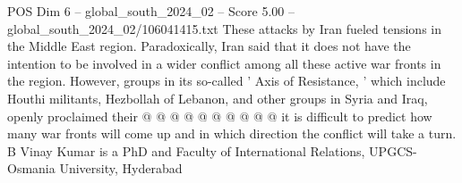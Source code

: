 \begin{textsample}{POS Dim 6 – global\_south\_2024\_02 – Score 5.00 – global\_south\_2024\_02/106041415.txt}
These attacks by Iran fueled tensions in the Middle East region.
Paradoxically, Iran said that it does not have the intention to be involved in a wider conflict among all these active war fronts in the region.
However, groups in its so-called ' Axis of Resistance, ' which include Houthi militants, Hezbollah of Lebanon, and other groups in Syria and Iraq, openly proclaimed their @ @ @ @ @ @ @ @ @ @ it is difficult to predict how many war fronts will come up and in which direction the conflict will take a turn.
B Vinay Kumar is a PhD and Faculty of International Relations, UPGCS-Osmania University, Hyderabad

\end{textsample}
